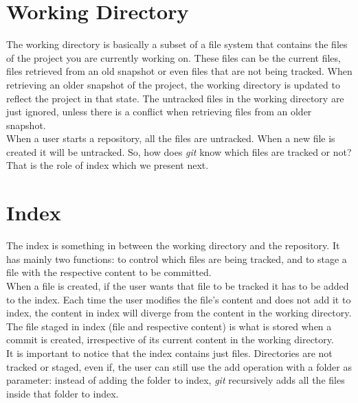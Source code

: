 \section{Working Directory}

The working directory is basically a subset of
a file system that contains the files of the project you are
currently working on. These files can be the current files, files
retrieved from an old snapshot or even files that are not being
tracked. When retrieving an older snapshot of the project, the
working directory is updated to reflect the project in that state. The
untracked files in the working directory are just ignored, unless
there is a conflict when retrieving files from an older snapshot.\\

When a user starts a repository, all the files are untracked. When a
new file is created it will be untracked. So, how does \emph{git} know which
files are tracked or not? That is the role of index which we present
next.

\section{Index}
The index is something in between the working directory and the
repository. It has mainly two functions: to control which files are
being tracked, and to stage a file with the respective content to be
committed.\\

When a file is created, if the user wants that file to be
tracked it has to be added to the index. Each time the user modifies
the file's content and does not add it to index, the content in
index will diverge from the content in the working directory. The
file staged in index (file and respective content) is what is stored 
when a commit is created, irrespective of its current content in the
working directory.\\

It is important to notice that the index contains
just files. Directories are not tracked or staged, even if, the user
can still use the add operation with a
folder as parameter: instead of adding the folder to index, \emph{git}
recursively adds all the files
inside that folder to index.

